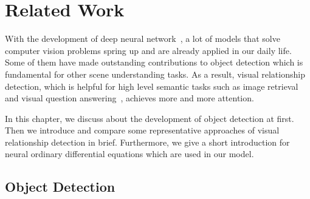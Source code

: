 \chapter{Related Work}
\label{chap:relatedwork}
With the development of deep neural network~\cite{krizhevsky2012imagenet,he2016deep}, a lot of models that solve computer vision problems spring up and are already applied in our daily life. Some of them have made outstanding contributions to object detection which is fundamental for other scene understanding tasks. As a result, visual relationship detection, which is helpful for high level semantic tasks such as image retrieval~\cite{johnson2015image} and visual question answering~\cite{ren2015exploring}, achieves more and more attention. 

In this chapter, we discuss about the development of object detection at first. Then we introduce and compare some representative approaches of visual relationship detection in brief. Furthermore, we give a short introduction for neural ordinary differential equations which are used in our model.

\section{Object Detection}

